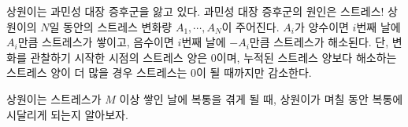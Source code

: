 상원이는 과민성 대장 증후군을 앓고 있다. 과민성 대장 증후군의 원인은 스트레스! 상원이의 $N$일 동안의 스트레스 변화량 $A_1, \cdots, A_N$이 주어진다. $A_i$가 양수이면 $i$번째 날에 $A_i$만큼 스트레스가 쌓이고, 음수이면 $i$번째 날에 $-A_i$만큼 스트레스가 해소된다. 단, 변화를 관찰하기 시작한 시점의 스트레스 양은 $0$이며, 누적된 스트레스 양보다 해소하는 스트레스 양이 더 많을 경우 스트레스는 $0$이 될 때까지만 감소한다.

상원이는 스트레스가 $M$ 이상 쌓인 날에 복통을 겪게 될 때, 상원이가 며칠 동안 복통에 시달리게 되는지 알아보자.